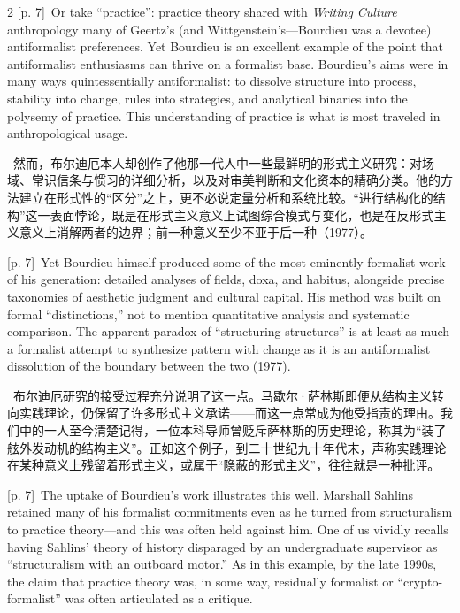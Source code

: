 \documentclass[10pt,a4paper]{article}
\begin{document}
\begin{paracol}{2}
\switchcolumn
{\scriptsize\color{gray} [p. 7]}\ Or take “practice”: practice theory shared with \textit{Writing Culture} anthropology many of Geertz’s (and Wittgenstein’s—Bourdieu was a devotee) antiformalist preferences. Yet Bourdieu is an excellent example of the point that antiformalist enthusiasms can thrive on a formalist base. Bourdieu’s aims were in many ways quintessentially antiformalist: to dissolve structure into process, stability into change, rules into strategies, and analytical binaries into the polysemy of practice. This understanding of practice is what is most traveled in anthropological usage.\par
\switchcolumn*
{\scriptsize\color{gray} [p. 7]}\ 然而，布尔迪厄本人却创作了他那一代人中一些最鲜明的形式主义研究：对场域、常识信条与惯习的详细分析，以及对审美判断和文化资本的精确分类。他的方法建立在形式性的“区分”之上，更不必说定量分析和系统比较。“进行结构化的结构”这一表面悖论，既是在形式主义意义上试图综合模式与变化，也是在反形式主义意义上消解两者的边界；前一种意义至少不亚于后一种（1977）。\par
\switchcolumn
{\scriptsize\color{gray} [p. 7]}\ Yet Bourdieu himself produced some of the most eminently formalist work of his generation: detailed analyses of fields, doxa, and habitus, alongside precise taxonomies of aesthetic judgment and cultural capital. His method was built on formal “distinctions,” not to mention quantitative analysis and systematic comparison. The apparent paradox of “structuring structures” is at least as much a formalist attempt to synthesize pattern with change as it is an antiformalist dissolution of the boundary between the two (1977).\par
\switchcolumn*
{\scriptsize\color{gray} [p. 7]}\ 布尔迪厄研究的接受过程充分说明了这一点。马歇尔·萨林斯即便从结构主义转向实践理论，仍保留了许多形式主义承诺——而这一点常成为他受指责的理由。我们中的一人至今清楚记得，一位本科导师曾贬斥萨林斯的历史理论，称其为“装了舷外发动机的结构主义”。正如这个例子，到二十世纪九十年代末，声称实践理论在某种意义上残留着形式主义，或属于“隐蔽的形式主义”，往往就是一种批评。\par
\switchcolumn
{\scriptsize\color{gray} [p. 7]}\ The uptake of Bourdieu’s work illustrates this well. Marshall Sahlins retained many of his formalist commitments even as he turned from structuralism to practice theory—and this was often held against him. One of us vividly recalls having Sahlins’ theory of history disparaged by an undergraduate supervisor as “structuralism with an outboard motor.” As in this example, by the late 1990s, the claim that practice theory was, in some way, residually formalist or “crypto-formalist” was often articulated as a critique.\par

\end{paracol}
\end{document}
